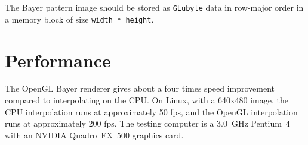 \documentclass[11pt,letterpaper]{article}
\begin{document}
The Bayer pattern image should be stored as \texttt{GLubyte} data in
row-major order in a memory block of size \texttt{width * height}.
\section{Performance}

The OpenGL Bayer renderer gives about a four times speed improvement
compared to interpolating on the CPU.  On Linux, with a 640x480 image,
the CPU interpolation runs at approximately 50 fps, and the OpenGL
interpolation runs at approximately 200 fps.  The testing computer is
a 3.0~GHz Pentium~4 with an NVIDIA Quadro~FX~500 graphics card.



\end{document}
